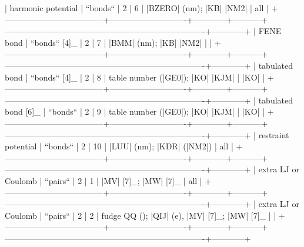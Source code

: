             | harmonic potential                 | ``bonds``                  | 2          | 6         | |BZERO| (nm); |KB| |NM2|                                                | all        | 
            +------------------------------------+----------------------------+------------+-----------+-------------------------------------------------------------------------+------------+
            | FENE bond                          | ``bonds`` [4]_             | 2          | 7         | |BMM|   (nm); |KB| |NM2|                                                |            | 
            +------------------------------------+----------------------------+------------+-----------+-------------------------------------------------------------------------+------------+
            | tabulated bond                     | ``bonds`` [4]_             | 2          | 8         | table number (|GE0|); |KO| |KJM|                                        | |KO|       |
            +------------------------------------+----------------------------+------------+-----------+-------------------------------------------------------------------------+------------+
            | tabulated bond [6]_                | ``bonds``                  | 2          | 9         | table number (|GE0|); |KO| |KJM|                                        | |KO|       |
            +------------------------------------+----------------------------+------------+-----------+-------------------------------------------------------------------------+------------+
            | restraint potential                | ``bonds``                  | 2          | 10        | |LUU| (nm); |KDR| (|NM2|)                                               | all        | 
            +------------------------------------+----------------------------+------------+-----------+-------------------------------------------------------------------------+------------+
            | extra LJ or Coulomb                | ``pairs``                  | 2          | 1         | |MV| [7]_; |MW| [7]_                                                    | all        | 
            +------------------------------------+----------------------------+------------+-----------+-------------------------------------------------------------------------+------------+
            | extra LJ or Coulomb                | ``pairs``                  | 2          | 2         | fudge QQ (); |QIJ| (e), |MV| [7]_; |MW| [7]_                            |            | 
            +------------------------------------+----------------------------+------------+-----------+-------------------------------------------------------------------------+------------+

